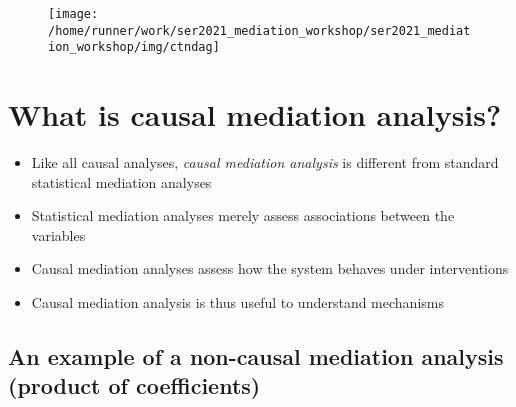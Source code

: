 \documentclass[
  12pt,
]{book}
\providecommand{\tightlist}{%
  \setlength{\itemsep}{0pt}\setlength{\parskip}{0pt}}
\theoremstyle{definition}
\theoremstyle{definition}
\theoremstyle{definition}
\newcommand{\1}{\mathbbm{1}}
\begin{document}
\begin{figure}

{\centering \texttt{[image: /home/runner/work/ser2021\_mediation\_workshop/ser2021\_mediation\_workshop/img/ctndag]} 

}

\end{figure}

\hypertarget{what-is-causal-mediation-analysis}{%
\section{What is causal mediation analysis?}\label{what-is-causal-mediation-analysis}}

\begin{itemize}
\tightlist
\item
  Like all causal analyses, \emph{causal mediation analysis} is different from
  standard statistical mediation analyses
\item
  Statistical mediation analyses merely assess associations between the variables
\item
  Causal mediation analyses assess how the system behaves under interventions
\item
  Causal mediation analysis is thus useful to understand mechanisms
\end{itemize}

\hypertarget{an-example-of-a-non-causal-mediation-analysis-product-of-coefficients}{%
\subsection{An example of a non-causal mediation analysis (product of coefficients)}\label{an-example-of-a-non-causal-mediation-analysis-product-of-coefficients}}
\end{document}
